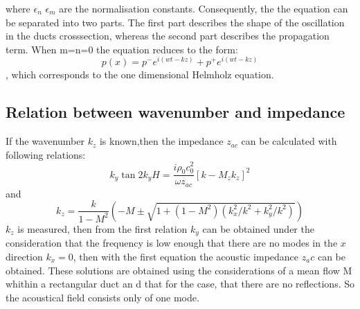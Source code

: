 \documentclass[11pt]{report} %
\begin{document}
where $\epsilon_{n}$ $\epsilon_{m}$ are the normalisation constants. 
Consequently, the the equation can be separated into two parts. 
The first part describes the shape of the oscillation in the ducts crosssection, whereas the second part describes the propagation term. 
When m=n=0 the equation reduces to the form:
\begin{equation}
p(x)=p^{-}e^{i(wt-kz)}+p^{+}e^{i(wt-kz)} 
\end{equation}, which corresponds to the one dimensional Helmholz equation. 
  

\subsection{Relation between wavenumber and impedance}
If the wavenumber $k_z$ is known,then the impedance $z_{ac}$ can be calculated with following relations:  
\begin{equation}\label{eqn: Impdet1}
    k_y \tan 2k_y H = \frac{i \rho_0 c_0^2}{\omega z_{ac}} \left[k-M_zk_z\right]^2
\end{equation}
and
\begin{equation}\label{eqn: Impdet2}
    k_z = \frac{k}{1-M^2} \left( -M \pm \sqrt{1+(1-M^2)(k_x^2/k^2 + k_y^2/k^2)}\right)    
\end{equation}
$k_z$ is measured, then from the first relation $k_y$ can be obtained under the consideration that the frequency is low enough that there are no modes in the $x$ direction $k_x = 0$, then with the first equation the acoustic impedance $z_ac$ can be obtained.
These solutions are obtained using the considerations of a mean flow M whithin a rectangular duct an d that for the case, that there are no reflections. So the acoustical field consists only of one mode. 
\end{document}

